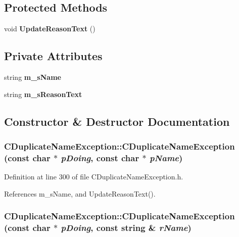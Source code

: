 \subsection*{Protected Methods}
\begin{CompactItemize}
\item 
void {\bf Update\-Reason\-Text} ()
\end{CompactItemize}
\subsection*{Private Attributes}
\begin{CompactItemize}
\item 
string {\bf m\_\-s\-Name}
\item 
string {\bf m\_\-s\-Reason\-Text}
\end{CompactItemize}


\subsection{Constructor \& Destructor Documentation}
\subsubsection{\setlength{\rightskip}{0pt plus 5cm}CDuplicate\-Name\-Exception::CDuplicate\-Name\-Exception (const char $\ast$ {\em p\-Doing}, const char $\ast$ {\em p\-Name})\hspace{0.3cm}{\tt  [inline]}}\label{classCDuplicateNameException_a0}




Definition at line 300 of file CDuplicate\-Name\-Exception.h.

References m\_\-s\-Name, and Update\-Reason\-Text().
\subsubsection{\setlength{\rightskip}{0pt plus 5cm}CDuplicate\-Name\-Exception::CDuplicate\-Name\-Exception (const char $\ast$ {\em p\-Doing}, const string \& {\em r\-Name})\hspace{0.3cm}{\tt  [inline]}}\label{classCDuplicateNameException_a1}




